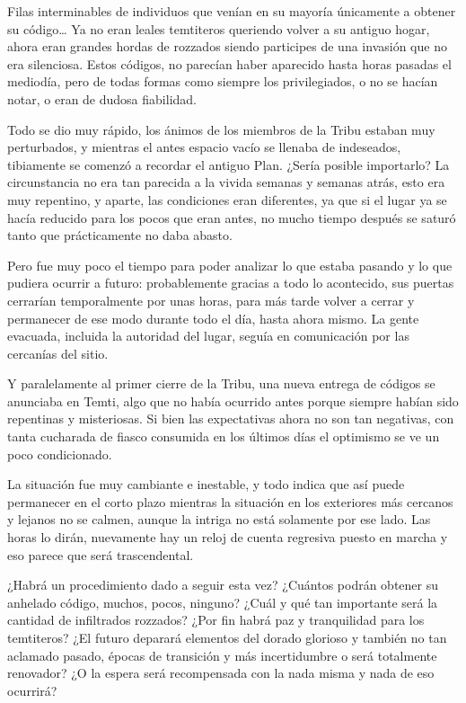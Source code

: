 \documentclass[
  spanish,
]{book}
\begin{document}
Filas interminables de individuos que venían en su mayoría únicamente a obtener su código\ldots{} Ya no eran leales temtiteros queriendo volver a su antiguo hogar, ahora eran grandes hordas de rozzados siendo participes de una invasión que no era silenciosa.
Estos códigos, no parecían haber aparecido hasta horas pasadas el mediodía, pero de todas formas como siempre los privilegiados, o no se hacían notar, o eran de dudosa fiabilidad.

Todo se dio muy rápido, los ánimos de los miembros de la Tribu estaban muy perturbados, y mientras el antes espacio vacío se llenaba de indeseados, tibiamente se comenzó a recordar el antiguo Plan. ¿Sería posible importarlo?
La circunstancia no era tan parecida a la vivida semanas y semanas atrás, esto era muy repentino, y aparte, las condiciones eran diferentes, ya que si el lugar ya se hacía reducido para los pocos que eran antes, no mucho tiempo después se saturó tanto que prácticamente no daba abasto.

Pero fue muy poco el tiempo para poder analizar lo que estaba pasando y lo que pudiera ocurrir a futuro: probablemente gracias a todo lo acontecido, sus puertas cerrarían temporalmente por unas horas, para más tarde volver a cerrar y permanecer de ese modo durante todo el día, hasta ahora mismo. La gente evacuada, incluida la autoridad del lugar, seguía en comunicación por las cercanías del sitio.

Y paralelamente al primer cierre de la Tribu, una nueva entrega de códigos se anunciaba en Temti, algo que no había ocurrido antes porque siempre habían sido repentinas y misteriosas. Si bien las expectativas ahora no son tan negativas, con tanta cucharada de fiasco consumida en los últimos días el optimismo se ve un poco condicionado.

La situación fue muy cambiante e inestable, y todo indica que así puede permanecer en el corto plazo mientras la situación en los exteriores más cercanos y lejanos no se calmen, aunque la intriga no está solamente por ese lado. Las horas lo dirán, nuevamente hay un reloj de cuenta regresiva puesto en marcha y eso parece que será trascendental.

¿Habrá un procedimiento dado a seguir esta vez? ¿Cuántos podrán obtener su anhelado código, muchos, pocos, ninguno? ¿Cuál y qué tan importante será la cantidad de infiltrados rozzados? ¿Por fin habrá paz y tranquilidad para los temtiteros? ¿El futuro deparará elementos del dorado glorioso y también no tan aclamado pasado, épocas de transición y más incertidumbre o será totalmente renovador? ¿O la espera será recompensada con la nada misma y nada de eso ocurrirá?
\end{document}
